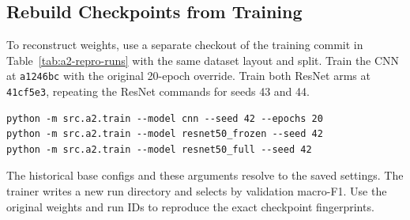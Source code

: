 \subsection{Rebuild Checkpoints from Training}

To reconstruct weights, use a separate checkout of the training commit in Table~\ref{tab:a2-repro-runs} with the same dataset layout and split. Train the CNN at \texttt{a1246bc} with the original 20-epoch override. Train both ResNet arms at \texttt{41cf5e3}, repeating the ResNet commands for seeds 43 and 44.

\begin{verbatim}
python -m src.a2.train --model cnn --seed 42 --epochs 20
python -m src.a2.train --model resnet50_frozen --seed 42
python -m src.a2.train --model resnet50_full --seed 42
\end{verbatim}

The historical base configs and these arguments resolve to the saved settings. The trainer writes a new run directory and selects  by validation macro-F1. Use the original weights and run IDs to reproduce the exact checkpoint fingerprints.
